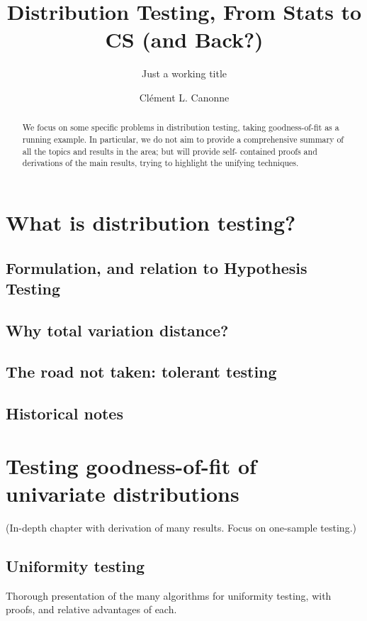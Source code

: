 \documentclass[biber]{nowfnt} %
\title{Distribution Testing, From Stats to CS (and Back?)}
\subtitle{Just a working title}
\author[1]{Cl\'ement L. Canonne}
\affil[1]{University of Sydney; clement.canonne@sydney.edu.au}
\begin{document}
\makeabstracttitle

\begin{abstract}
We focus on some specific problems in distribution testing,
taking goodness-of-fit as a running example. In particular,
we do not aim to provide a comprehensive summary of all
the topics and results in the area; but will provide self-
contained proofs and derivations of the main results, trying
to highlight the unifying techniques.
\end{abstract}

\chapter{What is distribution testing?}

\section{Formulation, and relation to Hypothesis Testing}
\section{Why total variation distance?}
\section{The road not taken: tolerant testing}
\section{Historical notes}


\chapter{Testing goodness-of-fit of univariate distributions}

(In-depth chapter with derivation of many results. Focus on one-sample
testing.)

\section{Uniformity testing}
Thorough presentation of the many algorithms for uniformity testing,
with proofs, and relative advantages of each.
\end{document}
